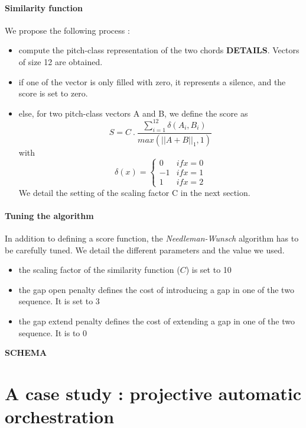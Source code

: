 \documentclass[twoside,twocolumn]{article}
\begin{document}
\paragraph{Similarity function}
We propose the following process :
\begin{itemize}
\item compute the pitch-class representation of the two chords \textbf{DETAILS}. Vectors of size 12 are obtained.
\item if one of the vector is only filled with zero, it represents a silence, and the score is set to zero.
\item else, for two pitch-class vectors A and B, we define the score as 
\begin{equation}
S =	C \ . \ \frac{\sum_{i=1}^{12} \delta(A_i , B_i)}{max(||A+B||_1 , 1)}
\end{equation}
with
\[\delta(x) =
    \begin{cases*}
      0 & if x = 0\\
      -1 & if x = 1\\
      1 & if x = 2
    \end{cases*} 
\]
We detail the setting of the scaling factor C in the next section.
\end{itemize}

\paragraph{Tuning the algorithm}
In addition to defining a score function, the \textit{Needleman-Wunsch} algorithm has to be carefully tuned. We detail the different parameters and the value we used.
\begin{itemize}
\item the scaling factor of the similarity function ($C$) is set to 10
\item the gap open penalty defines the cost of introducing a gap in one of the two sequence. It is set to 3
\item the gap extend penalty defines the cost of extending a gap in one of the two sequence. It is to 0
\end{itemize}

\textbf{SCHEMA}

\section{A case study : projective automatic orchestration}
\end{document}
